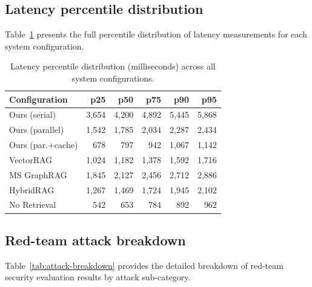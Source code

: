 \documentclass[review]{elsarticle}
\begin{document}
\subsection{Latency percentile distribution}

Table~\ref{tab:latency-percentiles} presents the full percentile distribution of latency measurements for each system configuration.

\begin{table}[ht]
\caption{Latency percentile distribution (milliseconds) across all system configurations.}
\label{tab:latency-percentiles}
\centering
\small
\begin{tabular}{@{}lrrrrr@{}}
\toprule
\textbf{Configuration} & \textbf{p25} & \textbf{p50} & \textbf{p75} & \textbf{p90} & \textbf{p95} \\
\midrule
Ours (serial) & 3,654 & 4,200 & 4,892 & 5,445 & 5,868 \\
Ours (parallel) & 1,542 & 1,785 & 2,034 & 2,287 & 2,434 \\
Ours (par.+cache) & 678 & 797 & 942 & 1,067 & 1,142 \\
VectorRAG & 1,024 & 1,182 & 1,378 & 1,592 & 1,716 \\
MS GraphRAG & 1,845 & 2,127 & 2,456 & 2,712 & 2,886 \\
HybridRAG & 1,267 & 1,469 & 1,724 & 1,945 & 2,102 \\
No Retrieval & 542 & 653 & 784 & 892 & 962 \\
\bottomrule
\end{tabular}
\end{table}

\subsection{Red-team attack breakdown}

Table~\ref{tab:attack-breakdown} provides the detailed breakdown of red-team security evaluation results by attack sub-category.
\end{document}
